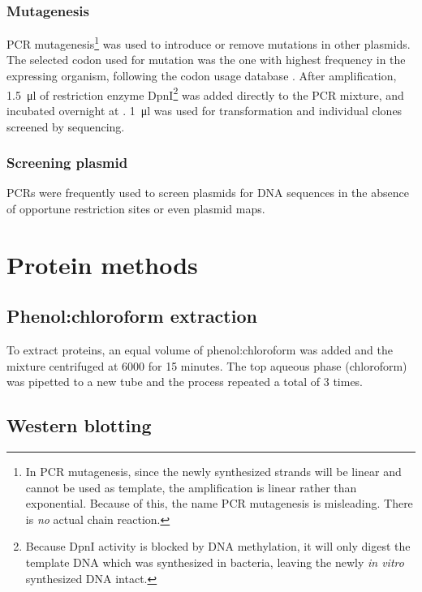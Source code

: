     \subsubsection{Mutagenesis}
      PCR mutagenesis\footnote{In PCR mutagenesis, since the newly synthesized strands will be linear and cannot be
                               used as template, the amplification is linear rather than exponential. Because of this,
                               the name PCR mutagenesis is misleading. There is \emph{no} actual chain reaction.}
      was used to introduce or remove mutations in other plasmids. The selected codon used for mutation was the one
      with highest frequency in the expressing organism, following the codon usage database \citep{codon_usage}. After
      amplification, \SI{1.5}{\ul} of restriction enzyme DpnI\footnote{Because DpnI activity is blocked by DNA methylation,
                                 it will only digest the template DNA which was synthesized in bacteria, leaving the
                                 newly \textit{in vitro} synthesized DNA intact.}
      was added directly to the PCR mixture, and incubated overnight at . \SI{1}{\ul} was used for transformation
      and individual clones screened by sequencing.
    
    \subsubsection{Screening plasmid}
      PCRs were frequently used to screen plasmids for DNA sequences in the absence of opportune restriction sites
      or even plasmid maps.

\section{Protein methods}
  \subsection{Phenol:chloroform extraction}
    \label{sec:phenol-extraction}
    To extract proteins, an equal volume of phenol:chloroform was added and the
    mixture centrifuged at \SI{6000}{\gn} for 15 minutes. The top aqueous phase (chloroform)
    was pipetted to a new tube and the process repeated a total of 3 times.

  \subsection{Western blotting}
